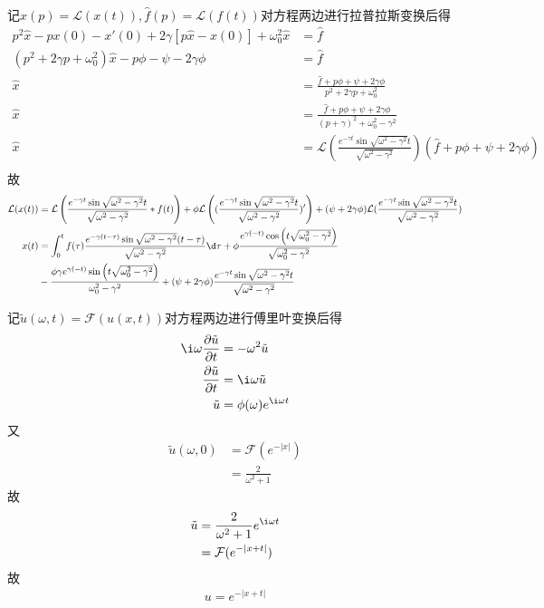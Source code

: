 \documentclass{phyasgn}
\renewcommand{\L}{\mathcal{L}}
\newcommand{\F}{\mathcal{F}}
\begin{document}
\begin{sol}[2]
记$\hat{x}(p)=\L(x(t)),\hat{f}(p)=\L(f(t))$对方程两边进行拉普拉斯变换后得
\begin{align*}
    p^2\hat{x}-px(0)-x'(0)+2\gamma[p\hat{x}-x(0)]+\omega_0^2\hat{x}&=\hat{f}\\
    (p^2+2\gamma p+\omega_0^2)\hat{x}-p\phi-\psi-2\gamma\phi&=\hat{f}\\
    \hat{x}&=\frac{\hat{f}+p\phi+\psi+2\gamma\phi}{p^2+2\gamma p+\omega_0^2}\\
    \hat{x}&=\frac{\hat{f}+p\phi+\psi+2\gamma\phi}{(p+\gamma)^2+\omega_0^2-\gamma^2}\\
    \hat{x}&=\L\left(\frac{e^{-\gamma t}\sin\sqrt{\omega^2-\gamma^2}t}{\sqrt{\omega^2-\gamma^2}}\right)(\hat{f}+p\phi+\psi+2\gamma\phi)\\
\end{align*}
故
\begin{align*}
    \L(x(t))&=\L\left(\frac{e^{-\gamma t}\sin\sqrt{\omega^2-\gamma^2}t}{\sqrt{\omega^2-\gamma^2}}*f(t)\right)+\phi\L\left((\frac{e^{-\gamma t}\sin\sqrt{\omega^2-\gamma^2}t}{\sqrt{\omega^2-\gamma^2}})'\right)+(\psi+2\gamma\phi)\L(\frac{e^{-\gamma t}\sin\sqrt{\omega^2-\gamma^2}t}{\sqrt{\omega^2-\gamma^2}})\\
    x(t)&=\int_0^tf(\tau)\frac{e^{-\gamma (t-\tau)}\sin\sqrt{\omega^2-\gamma^2} (t-\tau)}{\sqrt{\omega^2-\gamma^2}}\d\tau+\phi\frac{e^{\gamma  (-t)} \cos \left(t \sqrt{\omega_0^2-\gamma ^2}\right)}{\sqrt{\omega_0^2-\gamma ^2}}\\
    &-\frac{\phi\gamma  e^{\gamma  (-t)} \sin \left(t \sqrt{\omega_0^2-\gamma ^2}\right)}{\omega_0^2-\gamma ^2}+(\psi+2\gamma\phi)\frac{e^{-\gamma t}\sin\sqrt{\omega^2-\gamma^2}t}{\sqrt{\omega^2-\gamma^2}}
\end{align*}
\end{sol}\par

\begin{sol}[3]
记$\tilde{u}(\omega,t)=\F(u(x,t))$对方程两边进行傅里叶变换后得
\begin{align*}
   \i\omega\frac{\partial\tilde{u}}{\partial t}&=-\omega^2\tilde{u}\\
   \frac{\partial\tilde{u}}{\partial t}&=\i\omega\tilde{u}\\
   \tilde{u}&=\phi(\omega)e^{\i\omega t}
\end{align*}
又
\begin{align*}
    \tilde{u}(\omega,0)&=\F(e^{-|x|})\\
    &=\frac{2}{\omega^2+1}
\end{align*}
故
\begin{align*}
    \tilde{u}&=\frac{2}{\omega^2+1}e^{\i\omega t}\\
    &=\F(e^{-|x+t|})
\end{align*}
故
\begin{align*}
    u=e^{-|x+t|}
\end{align*}
\end{sol}\par
\end{document}
